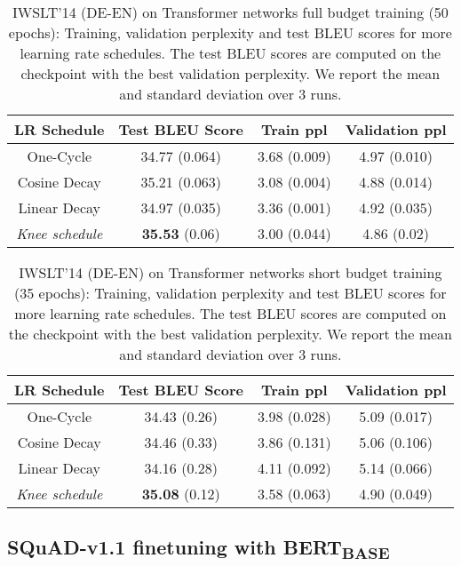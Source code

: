 \documentclass[twoside,11pt]{article}
\newcommand{\lrschedule}{\textit{Knee schedule}}
\begin{document}
\begin{table}[h]
\small
\centering
\caption{IWSLT'14 (DE-EN) on Transformer networks full budget training (50 epochs): Training, validation perplexity and test BLEU scores for more learning rate schedules. The test BLEU scores are computed on the checkpoint with the best validation perplexity. We report the mean and standard deviation over 3 runs.}
\label{tab:iwslt_results_extra_baselines_full_budget}
\begin{tabular}{cccc}
  \toprule
  LR Schedule   & Test BLEU Score  & Train ppl & Validation ppl  \\ 
  \midrule
  One-Cycle     &  34.77 (0.064) & 3.68 (0.009)  & 4.97 (0.010)   \\
  Cosine Decay  &  35.21 (0.063) & 3.08 (0.004)   & 4.88 (0.014)  \\
  Linear Decay  &  34.97 (0.035) & 3.36 (0.001)   & 4.92 (0.035)   \\
  \lrschedule{} &  \textbf{35.53} (0.06)  & 3.00 (0.044)   & 4.86 (0.02)    \\ 
  \bottomrule
\end{tabular}

\end{table}

\begin{table}[h]
\small
\centering
\caption{IWSLT'14 (DE-EN) on Transformer networks short budget training (35 epochs): Training, validation perplexity and test BLEU scores for more learning rate schedules. The test BLEU scores are computed on the checkpoint with the best validation perplexity. We report the mean and standard deviation over 3 runs.}
\label{tab:iwslt_results_extra_baselines_short_budget}
\begin{tabular}{cccc}
  \toprule
  LR Schedule   & Test BLEU Score & Train ppl & Validation ppl    \\
  \midrule
  One-Cycle     &  34.43 (0.26) & 3.98 (0.028)  & 5.09 (0.017)     \\
  Cosine Decay  &  34.46 (0.33) & 3.86 (0.131)   & 5.06 (0.106)   \\
  Linear Decay  & 34.16  (0.28) & 4.11 (0.092)   & 5.14 (0.066)   \\
  \lrschedule{} & \textbf{35.08} (0.12) & 3.58 (0.063)   & 4.90 (0.049)    \\ 
  \bottomrule
\end{tabular}

\end{table}


\subsection{SQuAD-v1.1 finetuning with BERT\textsubscript{BASE}}
\end{document}
